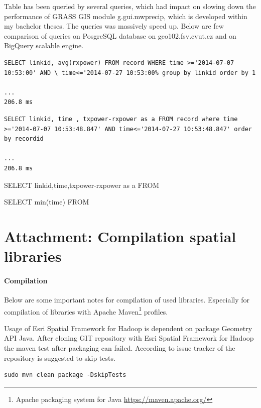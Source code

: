 \documentclass[a4paper,12pt,oneside]{report}
\begin{document}
		Table has been queried by several queries, which had impact on slowing down the performance of GRASS GIS module g.gui.mwprecip, which is developed within my bachelor theses. The queries was massively speed up. Below are few comparison of queries on PosgreSQL database on geo102.fsv.cvut.cz and on BigQuery scalable engine.
		
	\begin{footnotesize}
		\begin{lstlisting}[style=XML]
SELECT linkid, avg(rxpower) FROM record WHERE time >='2014-07-07 10:53:00' AND \ time<='2014-07-27 10:53:00% group by linkid order by 1

...
206.8 ms
		\end{lstlisting}
	\end{footnotesize}

		
	\begin{footnotesize}
		\begin{lstlisting}[style=XML]
SELECT linkid, time , txpower-rxpower as a FROM record where time >='2014-07-07 10:53:48.847' AND time<='2014-07-27 10:53:48.847' order by recordid
		
...
206.8 ms
		\end{lstlisting}
	\end{footnotesize}	
		SELECT linkid,time,txpower-rxpower as a FROM %
		
		SELECT min(time) FROM
	

	

\section{Attachment: Compilation spatial libraries}
\label{att:java}
	\paragraph{Compilation} Below are some important notes for compilation of used
	libraries. Especially for compilation of libraries with Apache Maven\footnote{Apache packaging system for Java \url{https://maven.apache.org/}} profiles.
	
	Usage of Esri Spatial Framework for Hadoop is dependent on package Geometry API
	Java. After cloning GIT repository with Esri Spatial Framework for Hadoop the
	maven test after packaging can failed. According to issue tracker of the
	repository is suggested to skip tests.
	\begin{footnotesize}
		\begin{lstlisting}[style=python]
sudo mvn clean package -DskipTests 
		\end{lstlisting}
	\end{footnotesize}
	
\end{document}
